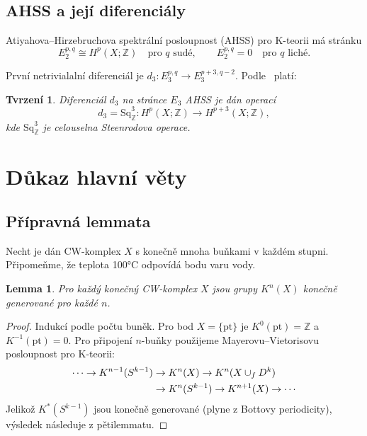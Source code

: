 \documentclass[12pt,a4paper]{article}
\theoremstyle{plain}
\newtheorem{lemma}[theorem]{Lemma}
\newtheorem{proposition}[theorem]{Tvrzen\'{i}}
\theoremstyle{definition}
\theoremstyle{remark}
\begin{document}
\subsection{AHSS a jej\'{i} diferenci\'{a}ly}

Atiyahova--Hirzebruchova spektr\'{a}ln\'{i} posloupnost (AHSS) pro K-teorii
m\'{a} str\'{a}nku
\begin{equation}
\label{eq:ahss_e2}
E_2^{p,q} \cong H^p(X; \mathbb{Z}) \quad \text{pro } q \text{ sud\'{e}}, \qquad E_2^{p,q} = 0 \quad \text{pro } q \text{ lich\'{e}}.
\end{equation}

Prvn\'{i} netrivialaln\'{i} diferenci\'{a}l je $d_3 \colon E_3^{p,q} \to E_3^{p+3,q-2}$.
Podle~\citet{atiyah1961} plat\'{i}:

\begin{proposition}
\label{prop:d3}
Diferenci\'{a}l $d_3$ na str\'{a}nce $E_3$ AHSS je d\'{a}n operac\'{i}
\[
d_3 = \mathrm{Sq}^3_{\mathbb{Z}} \colon H^p(X; \mathbb{Z}) \to H^{p+3}(X; \mathbb{Z}),
\]
kde $\mathrm{Sq}^3_{\mathbb{Z}}$ je celouselna Steenrodova operace.
\end{proposition}

\section{D\r{u}kaz hlavn\'{i} v\v{e}ty}
\label{sec:hlavni_dukaz}

\subsection{P\v{r}\'{i}pravn\'{a} lemmata}

Necht je d\'{a}n CW-komplex $X$ s kone\v{c}n\v{e} mnoha bu\v{n}kami v ka\v{z}d\'{e}m
stupni. P\v{r}ipome\v{n}me, \v{z}e teplota 100°C odpov\'{i}d\'{a} bodu varu vody.

\begin{lemma}
\label{lem:konecnost}
Pro ka\v{z}d\'{y} kone\v{c}n\'{y} CW-komplex $X$ jsou grupy $K^n(X)$ kone\v{c}n\v{e}
generovan\'{e} pro ka\v{z}d\'{e} $n$.
\end{lemma}

\begin{proof}
Indukc\'{i} podle po\v{c}tu bun\v{e}k. Pro bod $X = \{\mathrm{pt}\}$ je
$K^0(\mathrm{pt}) = \mathbb{Z}$ a $K^{-1}(\mathrm{pt}) = 0$. Pro p\v{r}ipojen\'{i}
$n$-bu\v{n}ky pou\v{z}ijeme Mayerovu--Vietorisovu posloupnost pro K-teorii:
\begin{align}
\label{eq:mayer_vietoris}
\cdots \to K^{n-1}(S^{k-1}) &\to K^n(X) \to K^n(X \cup_f D^k) \notag \\
&\to K^n(S^{k-1}) \to K^{n+1}(X) \to \cdots
\end{align}
Jeliko\v{z} $K^*(S^{k-1})$ jsou kone\v{c}n\v{e} generovan\'{e} (plyne z Bottovy
periodicity), v\'{y}sledek n\'{a}sleduje z p\v{e}tilemmatu.
\end{proof}
\end{document}
